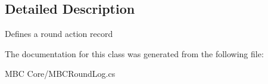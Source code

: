 \subsection{Detailed Description}
Defines a round action record

The documentation for this class was generated from the following file\-:\begin{DoxyCompactItemize}
\item 
M\-B\-C Core/M\-B\-C\-Round\-Log.\-cs\end{DoxyCompactItemize}
